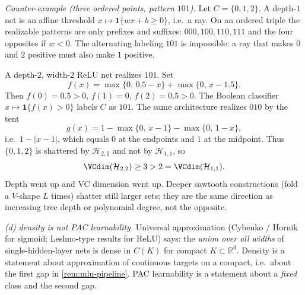 \begin{solution}
\textit{Counter-example (three ordered points, pattern $101$).}
Let $C=\{0,1,2\}$. A depth-$1$ net is an affine threshold $x\mapsto\mathbf{1}\{wx+b\ge 0\}$, i.e.\ a ray. On an ordered triple the realizable patterns are only prefixes and suffixes: $000,100,110,111$ and the four opposites if $w<0$. The alternating labeling $101$ is impossible: a ray that makes $0$ and $2$ positive must also make $1$ positive.

A depth-$2$, width-$2$ ReLU net realizes $101$. Set
\[
f(x)
=
\max\{0,\,0.5-x\}
+
\max\{0,\,x-1.5\}.
\]
Then $f(0)=0.5>0$, $f(1)=0$, $f(2)=0.5>0$. The Boolean classifier $x\mapsto\mathbf{1}\{f(x)>0\}$ labels $C$ as $101$. The same architecture realizes $010$ by the tent
\[
g(x)
=
1-\max\{0,\,x-1\}-\max\{0,\,1-x\},
\]
i.e.\ $1-\lvert x-1\rvert$, which equals $0$ at the endpoints and $1$ at the midpoint. Thus $\{0,1,2\}$ is shattered by $\mathcal{H}_{2,2}$ and not by $\mathcal{H}_{1,1}$, so
\[
\VCdim(\mathcal{H}_{2,2})
\ge
3
>
2
=
\VCdim(\mathcal{H}_{1,1}).
\]
Depth went up and VC dimension went up. Deeper sawtooth constructions (fold a $V$-shape $L$ times) shatter still larger sets; they are the same direction as increasing tree depth or polynomial degree, not the opposite.

\textit{(d) density is not PAC learnability.}
Universal approximation (Cybenko / Hornik for sigmoid; Leshno-type results for ReLU) says: the \emph{union over all widths} of single-hidden-layer nets is dense in $C(K)$ for compact $K\subset\mathbb{R}^d$. Density is a statement about approximation of continuous targets on a compact, i.e.\ about the first gap in \cref{rem:mlu-pipeline}. PAC learnability is a statement about a \emph{fixed} class and the second gap.


\end{solution}
